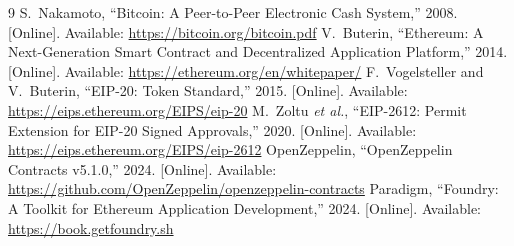 \begin{thebibliography}{9}
 S.~Nakamoto, ``Bitcoin: A Peer-to-Peer Electronic Cash System,'' 2008. [Online]. Available: \url{https://bitcoin.org/bitcoin.pdf}
 V.~Buterin, ``Ethereum: A Next-Generation Smart Contract and Decentralized Application Platform,'' 2014. [Online]. Available: \url{https://ethereum.org/en/whitepaper/}
 F.~Vogelsteller and V.~Buterin, ``EIP-20: Token Standard,'' 2015. [Online]. Available: \url{https://eips.ethereum.org/EIPS/eip-20}
 M.~Zoltu \emph{et al.}, ``EIP-2612: Permit Extension for EIP-20 Signed Approvals,'' 2020. [Online]. Available: \url{https://eips.ethereum.org/EIPS/eip-2612}
 OpenZeppelin, ``OpenZeppelin Contracts v5.1.0,'' 2024. [Online]. Available: \url{https://github.com/OpenZeppelin/openzeppelin-contracts}
 Paradigm, ``Foundry: A Toolkit for Ethereum Application Development,'' 2024. [Online]. Available: \url{https://book.getfoundry.sh}
\end{thebibliography}
